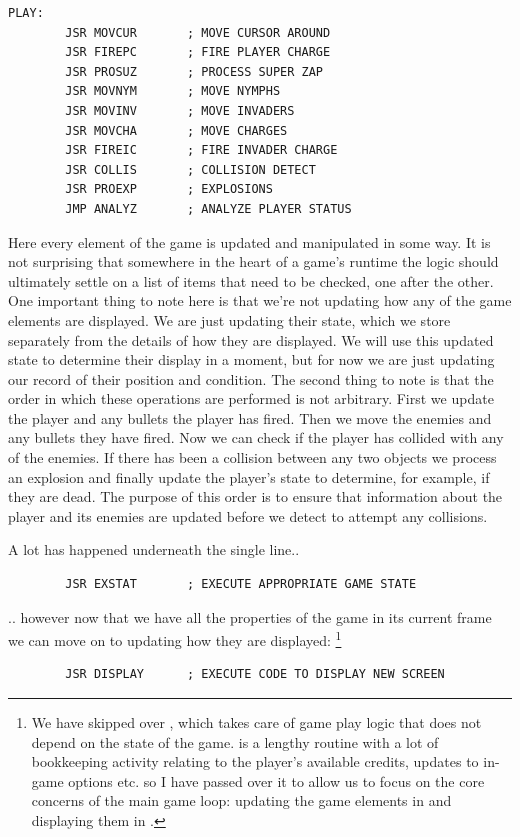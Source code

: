 \begin{lstlisting}
PLAY:
        JSR MOVCUR       ; MOVE CURSOR AROUND
        JSR FIREPC       ; FIRE PLAYER CHARGE
        JSR PROSUZ       ; PROCESS SUPER ZAP
        JSR MOVNYM       ; MOVE NYMPHS
        JSR MOVINV       ; MOVE INVADERS
        JSR MOVCHA       ; MOVE CHARGES
        JSR FIREIC       ; FIRE INVADER CHARGE
        JSR COLLIS       ; COLLISION DETECT
        JSR PROEXP       ; EXPLOSIONS
        JMP ANALYZ       ; ANALYZE PLAYER STATUS
\end{lstlisting}

Here every element of the game is updated and manipulated in some way. It is not surprising that somewhere in the heart of a
game's runtime the logic should ultimately settle on a list of items that need to be checked, one after the other. One important
thing to note here is that we're not updating how any of the game elements are displayed. We are just updating their state, which
we store separately from the details of how they are displayed. We will use this updated state to determine their display in a moment,
but for now we are just updating our record of their position and condition. The second thing to note is that the order in which
these operations are performed is not arbitrary. First we update the player and any bullets the player has fired. Then we move the
enemies and any bullets they have fired. Now we can check if the player has collided with any of the enemies. If there has been a
collision between any two objects we process an explosion and finally update the player's state to determine, for example, if they are dead. The purpose
of this order is to ensure that information about the player and its enemies are updated before we detect to attempt any collisions.

A lot has happened underneath the single line..

\begin{lstlisting}
        JSR EXSTAT       ; EXECUTE APPROPRIATE GAME STATE
\end{lstlisting}

.. however now that we have all the properties of the game in its current frame we can move on to updating how they are displayed:
\footnote{We have skipped over , which takes care of game play logic that does not depend on the state of the 
game.  is a lengthy routine with a lot of bookkeeping activity relating to the player's available credits, updates
to in-game options etc. so I have passed over it to allow us to focus on the core concerns of the main game loop: updating the game
elements in  and displaying them in .} 
\begin{lstlisting}
        JSR DISPLAY      ; EXECUTE CODE TO DISPLAY NEW SCREEN
\end{lstlisting}

